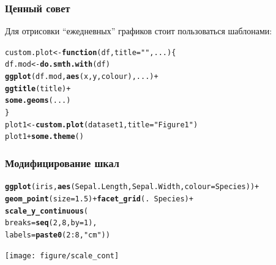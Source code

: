 \documentclass[compress]{beamer}\usepackage[]{graphicx}\usepackage[]{color}
\makeatletter
\newcommand{\hlnum}[1]{\textcolor[rgb]{0.686,0.059,0.569}{#1}}%
\newcommand{\hlstr}[1]{\textcolor[rgb]{0.192,0.494,0.8}{#1}}%
\newcommand{\hlopt}[1]{\textcolor[rgb]{0,0,0}{#1}}%
\newcommand{\hlstd}[1]{\textcolor[rgb]{0.345,0.345,0.345}{#1}}%
\newcommand{\hlkwa}[1]{\textcolor[rgb]{0.161,0.373,0.58}{\textbf{#1}}}%
\newcommand{\hlkwb}[1]{\textcolor[rgb]{0.69,0.353,0.396}{#1}}%
\newcommand{\hlkwc}[1]{\textcolor[rgb]{0.333,0.667,0.333}{#1}}%
\newcommand{\hlkwd}[1]{\textcolor[rgb]{0.737,0.353,0.396}{\textbf{#1}}}%
\newenvironment{kframe}{%
 \def\at@end@of@kframe{}%
 \ifinner\ifhmode%
  \def\at@end@of@kframe{\end{minipage}}%
  \begin{minipage}{\columnwidth}%
 \fi\fi%
 \def\FrameCommand##1{\hskip\@totalleftmargin \hskip-\fboxsep
 \colorbox{shadecolor}{##1}\hskip-\fboxsep
     \hskip-\linewidth \hskip-\@totalleftmargin \hskip\columnwidth}%
 \MakeFramed {\advance\hsize-\width
   \@totalleftmargin\z@ \linewidth\hsize
   \@setminipage}}%
 {\par\unskip\endMakeFramed%
 \at@end@of@kframe}
\newenvironment{knitrout}{}{} %
\makeatother
\begin{document}
\begin{frame}[fragile]
\frametitle{Ценный совет}
Для отрисовки ``ежедневных'' графиков стоит пользоваться шаблонами:
\begin{knitrout}\footnotesize
{}\color{fgcolor}\begin{kframe}
\begin{alltt}
\hlstd{custom.plot} \hlkwb{<-} \hlkwa{function}\hlstd{(}\hlkwc{df}\hlstd{,} \hlkwc{title} \hlstd{=} \hlstr{""}\hlstd{,} \hlkwc{...}\hlstd{) \{}
  \hlstd{df.mod} \hlkwb{<-} \hlkwd{do.smth.with}\hlstd{(df)}
  \hlkwd{ggplot}\hlstd{(df.mod,} \hlkwd{aes}\hlstd{(x, y, colour), ...)} \hlopt{+}
    \hlkwd{ggtitle}\hlstd{(title)} \hlopt{+}
    \hlkwd{some.geoms}\hlstd{(...)}
\hlstd{\}}
\hlstd{plot1} \hlkwb{<-} \hlkwd{custom.plot}\hlstd{(dataset1,} \hlkwc{title} \hlstd{=} \hlstr{"Figure 1"}\hlstd{)}
\hlstd{plot1} \hlopt{+} \hlkwd{some.theme}\hlstd{()}
\end{alltt}
\end{kframe}
\end{knitrout}

\end{frame}

\begin{frame}[fragile]
\frametitle{Модифицирование шкал}
\begin{knitrout}\footnotesize
{}\color{fgcolor}\begin{kframe}
\begin{alltt}
\hlkwd{ggplot}\hlstd{(iris,} \hlkwd{aes}\hlstd{(Sepal.Length, Sepal.Width,} \hlkwc{colour} \hlstd{= Species))} \hlopt{+}
  \hlkwd{geom_point}\hlstd{(}\hlkwc{size} \hlstd{=} \hlnum{1.5}\hlstd{)} \hlopt{+} \hlkwd{facet_grid}\hlstd{(.} \hlopt{~} \hlstd{Species)} \hlopt{+}
  \hlkwd{scale_y_continuous}\hlstd{(}
    \hlkwc{breaks} \hlstd{=} \hlkwd{seq}\hlstd{(}\hlnum{2}\hlstd{,} \hlnum{8}\hlstd{,} \hlkwc{by} \hlstd{=} \hlnum{1}\hlstd{),}
    \hlkwc{labels} \hlstd{=} \hlkwd{paste0}\hlstd{(}\hlnum{2}\hlopt{:}\hlnum{8}\hlstd{,} \hlstr{" cm"}\hlstd{))}
\end{alltt}
\end{kframe}
\texttt{[image: figure/scale\_cont]} 

\end{knitrout}

\end{frame}
\end{document}
